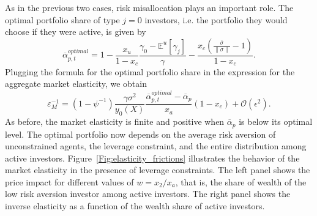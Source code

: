 As in the previous two cases, risk misallocation plays an important role. The optimal portfolio share of type $j = 0$ investors, i.e. the portfolio they would choose if they were active, is given by
\begin{equation}
    \overline{\alpha}_{p,t}^{optimal} = 1 -\frac{x_u}{1-x_c}\frac{\gamma_0-\mathbb{E}^u[\gamma_j] }{\gamma} - \frac{x_c(\frac{\overline{\sigma}}{\|\sigma\|}-1)  }{1-x_c}.
\end{equation}
Plugging the formula for the optimal portfolio share in the expression for the aggregate market elasticity, we obtain
\begin{equation}
	\varepsilon_M^{-1}=\left(1-\psi^{-1}\right) \frac{\gamma \sigma^{2}}{y_{0}(X)}\frac{\overline{\alpha}_{p,t}^{optimal}-\overline{\alpha}_{p}}{x_{a}}(1-x_c)+\mathcal{O}\left(\epsilon^{2}\right).
	\end{equation}
As before, the market elasticity is finite and positive when $\overline{\alpha}_p$ is below its optimal level. The optimal portfolio now depends on the average risk aversion of unconstrained agents, the leverage constraint, and the entire distribution among active investors. 
Figure~\ref{Fig:elasticity_frictions} illustrates the behavior of the market elasticity in the presence of leverage constraints. The left panel shows the price impact for different values of $w = x_2/x_a$, that is, the share of wealth of the low risk aversion investor among active investors. 
The right panel shows the inverse elasticity as a function of the wealth share of active investors. 



